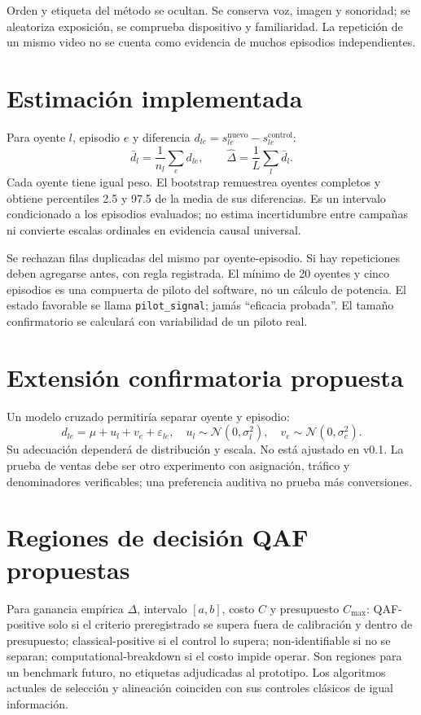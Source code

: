 \documentclass[11pt,a4paper]{article}
\begin{document}
Orden y etiqueta del método se ocultan. Se conserva voz, imagen y sonoridad; se aleatoriza exposición, se comprueba dispositivo y familiaridad. La repetición de un mismo video no se cuenta como evidencia de muchos episodios independientes.

\newpage
\section{Estimación implementada}
Para oyente $l$, episodio $e$ y diferencia $d_{le}=s^{\mathrm{nuevo}}_{le}-s^{\mathrm{control}}_{le}$:
\begin{equation}
 \bar d_l=\frac{1}{n_l}\sum_ed_{le},\qquad
 \hat\Delta=\frac{1}{L}\sum_l\bar d_l.
\end{equation}
Cada oyente tiene igual peso. El bootstrap remuestrea oyentes completos y obtiene percentiles 2.5 y 97.5 de la media de sus diferencias. Es un intervalo condicionado a los episodios evaluados; no estima incertidumbre entre campañas ni convierte escalas ordinales en evidencia causal universal.

Se rechazan filas duplicadas del mismo par oyente-episodio. Si hay repeticiones deben agregarse antes, con regla registrada. El mínimo de 20 oyentes y cinco episodios es una compuerta de piloto del software, no un cálculo de potencia. El estado favorable se llama \texttt{pilot\_signal}; jamás ``eficacia probada''. El tamaño confirmatorio se calculará con variabilidad de un piloto real.
\section{Extensión confirmatoria propuesta}
Un modelo cruzado permitiría separar oyente y episodio:
\begin{equation}
 d_{le}=\mu+u_l+v_e+\varepsilon_{le},\quad
 u_l\sim\mathcal N(0,\sigma_l^2),\quad v_e\sim\mathcal N(0,\sigma_e^2).
\end{equation}
Su adecuación dependerá de distribución y escala. No está ajustado en v0.1. La prueba de ventas debe ser otro experimento con asignación, tráfico y denominadores verificables; una preferencia auditiva no prueba más conversiones.
\section{Regiones de decisión QAF propuestas}
Para ganancia empírica $\Delta$, intervalo $[a,b]$, costo $C$ y presupuesto $C_{\max}$: QAF-positive solo si el criterio preregistrado se supera fuera de calibración y dentro de presupuesto; classical-positive si el control lo supera; non-identifiable si no se separan; computational-breakdown si el costo impide operar. Son regiones para un benchmark futuro, no etiquetas adjudicadas al prototipo. Los algoritmos actuales de selección y alineación coinciden con sus controles clásicos de igual información.
\end{document}
